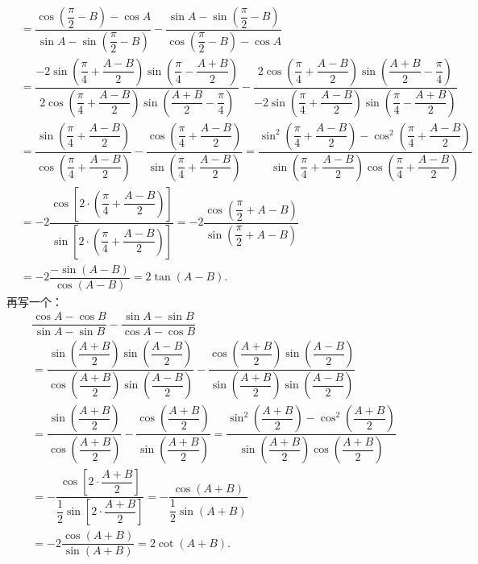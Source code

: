 \begin{solution}
\begin{align*}
&=\dfrac{\cos\left(\dfrac{\pi}{2} - B\right) - \cos A}{\sin A - \sin\left(\dfrac{\pi}{2} - B\right)} - \dfrac{\sin A - \sin\left(\dfrac{\pi}{2} - B\right)}{\cos\left(\dfrac{\pi}{2} - B\right) - \cos A}\\[1.2ex]
&=\dfrac{-2\sin\left(\dfrac{\pi}{4} + \dfrac{A - B}{2}\right)\sin\left(\dfrac{\pi}{4} - \dfrac{A + B}{2}\right)}{2\cos\left(\dfrac{\pi}{4} + \dfrac{A - B}{2}\right)\sin\left(\dfrac{A + B}{2} - \dfrac{\pi}{4}\right)} - \dfrac{2\cos\left(\dfrac{\pi}{4} + \dfrac{A - B}{2}\right)\sin\left(\dfrac{A + B}{2} - \dfrac{\pi}{4}\right)}{-2\sin\left(\dfrac{\pi}{4} + \dfrac{A - B}{2}\right)\sin\left(\dfrac{\pi}{4} - \dfrac{A + B}{2}\right)}\\[1.2ex]
&=\dfrac{\sin\left(\dfrac{\pi}{4} + \dfrac{A - B}{2}\right)}{\cos\left(\dfrac{\pi}{4} + \dfrac{A - B}{2}\right)} - \dfrac{\cos\left(\dfrac{\pi}{4} + \dfrac{A - B}{2}\right)}{\sin\left(\dfrac{\pi}{4} + \dfrac{A - B}{2}\right)} = \dfrac{\sin^2\left(\dfrac{\pi}{4} + \dfrac{A - B}{2}\right) - \cos^2\left(\dfrac{\pi}{4} + \dfrac{A - B}{2}\right)}{\sin\left(\dfrac{\pi}{4} + \dfrac{A - B}{2}\right)\cos\left(\dfrac{\pi}{4} + \dfrac{A - B}{2}\right)}\\[1.2ex]
&=-2\dfrac{\cos\left[2 \cdot \left(\dfrac{\pi}{4} + \dfrac{A - B}{2}\right)\right]}{\sin\left[2 \cdot \left(\dfrac{\pi}{4} + \dfrac{A - B}{2}\right)\right]} = -2\dfrac{\cos\left(\dfrac{\pi}{2} + A - B\right)}{\sin\left(\dfrac{\pi}{2} + A - B\right)}\\[1.2ex]
&=-2\dfrac{-\sin\left(A - B\right)}{\cos\left(A - B\right)} = 2\tan\left(A - B\right).
\end{align*}
再写一个：
\begin{align*}
&\dfrac{\cos A - \cos B}{\sin A - \sin B} - \dfrac{\sin A - \sin B}{\cos A - \cos B}\\[1.2ex]
&=\dfrac{\sin\left(\dfrac{A+B}{2}\right)\sin\left(\dfrac{A-B}{2}\right)}{\cos\left(\dfrac{A+B}{2}\right)\sin\left(\dfrac{A-B}{2}\right)} - \dfrac{\cos\left(\dfrac{A+B}{2}\right)\sin\left(\dfrac{A-B}{2}\right)}{\sin\left(\dfrac{A+B}{2}\right)\sin\left(\dfrac{A-B}{2}\right)}\\[1.2ex]
&=\dfrac{\sin\left(\dfrac{A+B}{2}\right)}{\cos\left(\dfrac{A+B}{2}\right)} - \dfrac{\cos\left(\dfrac{A+B}{2}\right)}{\sin\left(\dfrac{A+B}{2}\right)} = \dfrac{\sin^2\left(\dfrac{A+B}{2}\right) - \cos^2\left(\dfrac{A+B}{2}\right)}{\sin\left(\dfrac{A+B}{2}\right)\cos\left(\dfrac{A+B}{2}\right)}\\[1.2ex]
&=-\dfrac{\cos\left[2 \cdot \dfrac{A+B}{2}\right]}{\dfrac{1}{2}\sin\left[2 \cdot \dfrac{A+B}{2}\right]} = -\dfrac{\cos(A+B)}{\dfrac{1}{2}\sin(A+B)}\\[1.2ex]
&=-2\dfrac{\cos(A+B)}{\sin(A+B)} = 2\cot(A+B).
\end{align*}
\end{solution}
